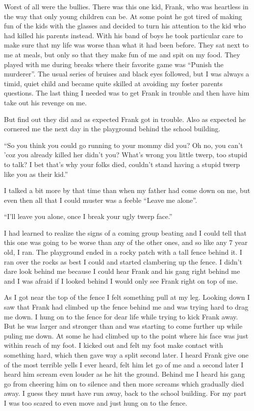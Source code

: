 \documentclass[11pt,letterpaper]{article}
\begin{document}
Worst of all were the bullies. There was this one kid, Frank, who was heartless in the way that only young children can be. At some point he got tired of making fun of the kids with the glasses and decided to turn his attention to the kid who had killed his parents instead. With his band of boys he took particular care to make sure that my life was worse than what it had been before. They sat next to me at meals, but only so that they make fun of me and spit on my food. They played with me during breaks where their favorite game was ``Punish the murderer''. The usual series of bruises and black eyes followed, but I was always a timid, quiet child and became quite skilled at avoiding my foster parents questions. The last thing I needed was to get Frank in trouble and then have him take out his revenge on me.

But find out they did and as expected Frank got in trouble. Also as expected he cornered me the next day in the playground behind the school building.

``So you think you could go running to your mommy did you? Oh no, you can't 'coz you already killed her didn't you? What's wrong you little twerp, too stupid to talk? I bet that's why your folks died, couldn't stand having a stupid twerp like you as their kid.''

I talked a bit more by that time than when my father had come down on me, but even then all that I could muster was a feeble  ``Leave me alone''.

``I'll leave you alone, once I break your ugly twerp face.''

I had learned to realize the signs of a coming group beating and I could tell that this one was going to be worse than any of the other ones, and so like any 7 year old, I ran. The playground ended in a rocky patch with a tall fence behind it. I ran over the rocks as best I could and started clambering up the fence. I didn't dare look behind me because I could hear Frank and his gang right behind me and I was afraid if I looked behind I would only see Frank right on top of me.

As I got near the top of the fence I felt something pull at my leg. Looking down I saw that Frank had climbed up the fence behind me and was trying hard to drag me down. I hung on to the fence for dear life while trying to kick Frank away. But he was larger and stronger than and was starting to come further up  while puling me down. At some he had climbed up to the point where his face was just within reach of my foot. I kicked out and felt my foot make contact with something hard, which then gave way a split second later. I heard Frank give one of the most terrible yells I ever heard, felt him let go of me and a second later I heard him scream even louder as he hit the ground. Behind me I heard his gang go from cheering him on to silence and then more screams which gradually died away. I guess they must have run away, back to the school building. For my part I was too scared to even move and just hung on to the fence.
\end{document}

